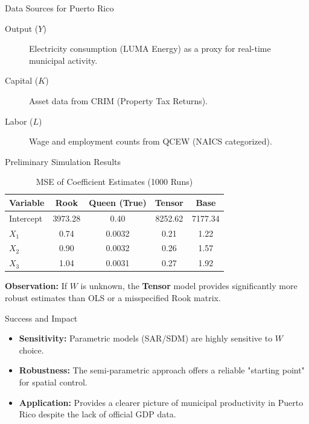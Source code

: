 \documentclass[12pt]{beamer}
\begin{document}
\begin{frame}{Data Sources for Puerto Rico}
	\begin{description}
		\item[Output ($Y$)] Electricity consumption (LUMA Energy) as a proxy for real-time municipal activity.
		\item[Capital ($K$)] Asset data from CRIM (Property Tax Returns).
		\item[Labor ($L$)] Wage and employment counts from QCEW (NAICS categorized).
	\end{description}
\end{frame}

\begin{frame}{Preliminary Simulation Results}
	\begin{table}
		\centering
		\caption{MSE of Coefficient Estimates (1000 Runs)}
		\scriptsize
		\begin{tabular}{lcccc}
			\toprule
			\textbf{Variable} & \textbf{Rook} & \textbf{Queen (True)} & \textbf{Tensor} & \textbf{Base} \\
			\midrule
			Intercept         & 3973.28       & 0.40                  & 8252.62         & 7177.34       \\
			$X_1$             & 0.74          & 0.0032                & 0.21            & 1.22          \\
			$X_2$             & 0.90          & 0.0032                & 0.26            & 1.57          \\
			$X_3$             & 1.04          & 0.0031                & 0.27            & 1.92          \\
			\bottomrule
		\end{tabular}
	\end{table}
	\textbf{Observation:} If $W$ is unknown, the \textbf{Tensor} model provides significantly more robust estimates than OLS or a misspecified Rook matrix.
\end{frame}

\begin{frame}{Success and Impact}
	\begin{itemize}
		\item \textbf{Sensitivity:} Parametric models (SAR/SDM) are highly sensitive to $W$ choice.
		\item \textbf{Robustness:} The semi-parametric approach offers a reliable "starting point" for spatial control.
		\item \textbf{Application:} Provides a clearer picture of municipal productivity in Puerto Rico despite the lack of official GDP data.
	\end{itemize}
\end{frame}
\end{document}

